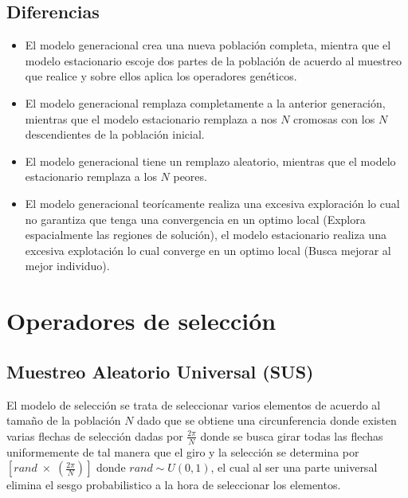 \documentclass[10pt]{article}
\begin{document}
\subsection{Diferencias}
\begin{itemize}
  \item El modelo generacional crea una nueva población completa, mientra que el modelo estacionario escoje dos partes de la población de acuerdo al muestreo que realice y sobre ellos aplica los operadores genéticos.
  \item El modelo generacional remplaza completamente a la anterior generación, mientras que el modelo estacionario remplaza a nos $N$ cromosas con los $N$ descendientes de la población inicial.
  \item El modelo generacional tiene un remplazo aleatorio, mientras que el modelo estacionario remplaza a los $N$ peores.
  \item El modelo generacional teorícamente realiza una excesiva exploración lo cual no garantiza que tenga una convergencia en un optimo local (Explora espacialmente las regiones de solución), el modelo estacionario realiza una excesiva explotación lo cual converge en un optimo local (Busca mejorar al mejor individuo).
\end{itemize}
\section{Operadores de selección}
\subsection{Muestreo Aleatorio Universal (SUS)}
El modelo de selección se trata de seleccionar varios elementos de acuerdo al tamaño de la población $N$ dado que se obtiene una circunferencia donde existen varias flechas de selección dadas por \(\displaystyle \frac{2\pi}{N}\) donde se busca girar todas las flechas uniformemente de tal manera que el giro y la selección se determina por \(\displaystyle \left[rand\;\times\;\left(\frac{2\pi}{N}\right)\right]\) donde \(\displaystyle rand\sim U(0,1)\), el cual al ser una parte universal elimina el sesgo probabilistico a la hora de seleccionar los elementos.
\end{document}
